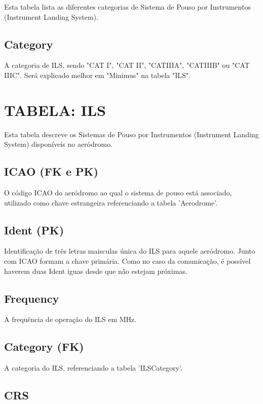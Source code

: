 Esta tabela lista as diferentes categorias de Sistema de Pouso por Instrumentos
 (Instrument Landing System).

\subsection{Category}

A categoria de ILS, sendo "CAT I", "CAT II", "CATIIIA", "CATIIIB" ou
 "CAT IIIC". Será explicado melhor em "Minimus" na tabela "ILS".

\section{TABELA: ILS}

Esta tabela descreve os Sistemas de Pouso por Instrumentos (Instrument
Landing System) disponíveis no aeródromo.

\subsection{ICAO (FK e PK)}

O código ICAO do aeródromo ao qual o sistema de pouso está associado, utilizado 
como chave estrangeira referenciando a tabela 'Aerodrome'.

\subsection{Ident (PK)}

Identificação de três letras maisculas única do ILS para aquele aeródromo.
Junto com ICAO formam a chave primária. Como no caso da comunicação, é
possível haverem duas Ident iguas desde que não estejam próximas.

\subsection{Frequency}

A frequência de operação do ILS em MHz.

\subsection{Category (FK)}

A categoria do ILS, referenciando a tabela 'ILSCategory'.

\subsection{CRS}

